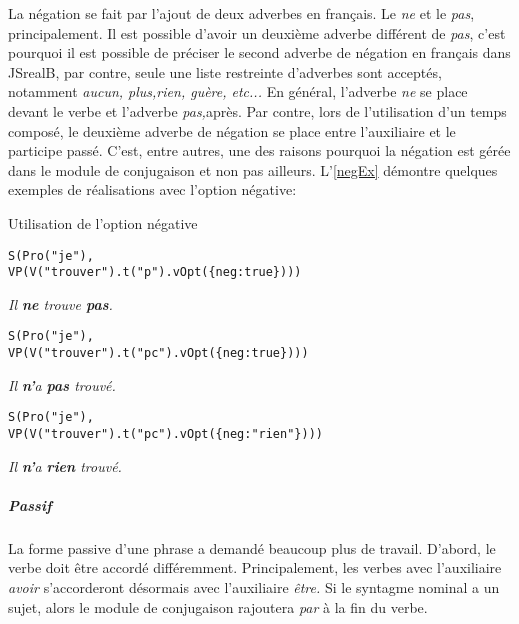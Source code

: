\documentclass[11pt]{article} %
\newcommand{\system}[1]{\textsf{#1}}
\newcommand{\JSB}{\system{JSrealB}}
\newcommand{\real}[1]{\emph{#1}}
\begin{document}
La négation se fait par l'ajout de deux adverbes en français. Le \emph{ne}
et le \emph{pas}, principalement. Il est possible d'avoir un
deuxième adverbe différent de \emph{pas}, c'est pourquoi il est possible
de préciser le second adverbe de négation en français dans \JSB{},
par contre, seule une liste restreinte d'adverbes sont acceptés, notamment
\emph{aucun, plus,rien, guère, etc... }En général, l'adverbe
\emph{ne }se place devant le verbe et l'adverbe \emph{pas,}après.
Par contre, lors de l'utilisation d'un temps composé, le deuxième
adverbe de négation se place entre l'auxiliaire et le participe passé.
C'est, entre autres, une des raisons pourquoi la négation est gérée
dans le module de conjugaison et non pas ailleurs. L'\autoref{negEx} démontre quelques
exemples de réalisations avec l'option négative:
\begin{example}
\caption{Utilisation de l'option négative}
\begin{alltt}
S(Pro("je"),
  VP(V("trouver").t("p").vOpt(\{neg:true\})))
\end{alltt}
\real{Il \textbf{ne} trouve \textbf{pas}.}\\

\begin{alltt}
S(Pro("je"),
  VP(V("trouver").t("pc").vOpt(\{neg:true\})))
\end{alltt}
\real{Il \textbf{n'}a \textbf{pas} trouvé.}\\

\begin{alltt}
S(Pro("je"),
  VP(V("trouver").t("pc").vOpt(\{neg:"rien"\})))
\end{alltt}
\real{Il \textbf{n'}a \textbf{rien} trouvé.}\\
\label{negEx}
\end{example}
\subparagraph{Passif}

La forme passive d'une phrase a demandé beaucoup plus de travail.
D'abord, le verbe doit être accordé différemment. Principalement,
les verbes avec l'auxiliaire \emph{avoir} s'accorderont désormais
avec l'auxiliaire \emph{être.} Si le syntagme nominal
a un sujet, alors le module de conjugaison rajoutera \emph{par}
à la fin du verbe.
\end{document}
